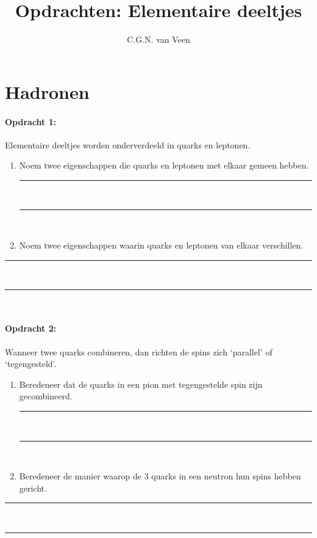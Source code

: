 
\usepackage{hepnames}
\usepackage{mhchem}

\title{Opdrachten: Elementaire deeltjes}
\author{C.G.N. van Veen}



\maketitle

\section{Hadronen}

\paragraph{Opdracht 1:}
Elementaire deeltjes worden onderverdeeld in quarks en leptonen. \\ 
\begin{enumerate}
\item Noem twee eigenschappen die quarks en leptonen met elkaar gemeen hebben.
\begin{center}
    \rule{\textwidth}{0.3mm}\\
    \rule{\textwidth}{0.3mm}\\
\end{center}
\item Noem twee eigenschappen waarin quarks en leptonen van elkaar verschillen.
\end{enumerate}
\begin{center}
    \rule{\textwidth}{0.3mm}\\
    \rule{\textwidth}{0.3mm}\\
\end{center}
\bigskip{}

\paragraph{Opdracht 2:}
Wanneer twee quarks combineren, dan richten de spins zich `parallel' 
of `tegengesteld'.\\
\begin{enumerate}
\item Beredeneer dat de quarks in een pion met tegengestelde spin zijn gecombineerd.
    \begin{center}
        \rule{\textwidth}{0.3mm}\\
        \rule{\textwidth}{0.3mm}\\
    \end{center}
\item Beredeneer de manier waarop de 3 quarks in een neutron hun spins hebben gericht.
\end{enumerate}
    \begin{center}
        \rule{\textwidth}{0.3mm}\\
        \rule{\textwidth}{0.3mm}\\
    \end{center}

